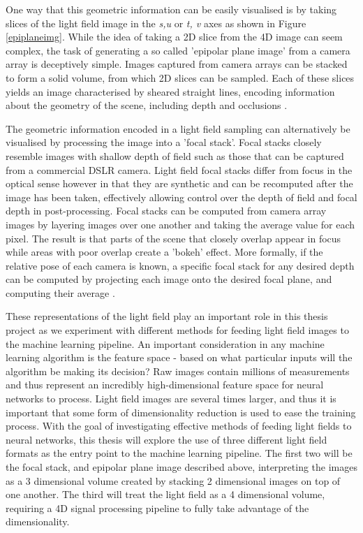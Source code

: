 One way that this geometric information can be easily visualised is by taking slices of the light field image in the \textit{s,u} or \textit{t, v} axes as shown in Figure \ref{epiplaneimg}. While the idea of taking a 2D slice from the 4D image can seem complex, the task of generating a so called 'epipolar plane image' from a camera array is deceptively simple. Images captured from camera arrays can be stacked to form a solid volume, from which 2D slices can be sampled. Each of these slices yields an image characterised by sheared straight lines, encoding information about the geometry of the scene, including depth and occlusions \cite{bolles1987epiplane}. 

The geometric information encoded in a light field sampling can alternatively be visualised by processing the image into a 'focal stack'. Focal stacks closely resemble images with shallow depth of field such as those that can be captured from a commercial DSLR camera. Light field focal stacks differ from focus in the optical sense however in that they are synthetic and can be recomputed after the image has been taken, effectively allowing control over the depth of field and focal depth in post-processing. Focal stacks can be computed from camera array images by layering images over one another and taking the average value for each pixel. The result is that parts of the scene that closely overlap appear in focus while areas with poor overlap create a 'bokeh' effect. More formally, if the relative pose of each camera is known, a specific focal stack for any desired depth can be computed by projecting each image onto the desired focal plane, and computing their average \cite{vaish2004parallax}.

These representations of the light field play an important role in this thesis project as we experiment with different methods for feeding light field images to the machine learning pipeline. An important consideration in any machine learning algorithm is the feature space - based on what particular inputs will the algorithm be making its decision? Raw images contain millions of measurements and thus represent an incredibly high-dimensional feature space for neural networks to process. Light field images are several times larger, and thus it is important that some form of dimensionality reduction is used to ease the training process. With the goal of investigating effective methods of feeding light fields to neural networks, this thesis will explore the use of three different light field formats as the entry point to the machine learning pipeline. The first two will be the focal stack, and epipolar plane image described above, interpreting the images as a 3 dimensional volume created by stacking 2 dimensional images on top of one another. The third will treat the light field as a 4 dimensional volume, requiring a 4D signal processing pipeline to fully take advantage of the dimensionality.

